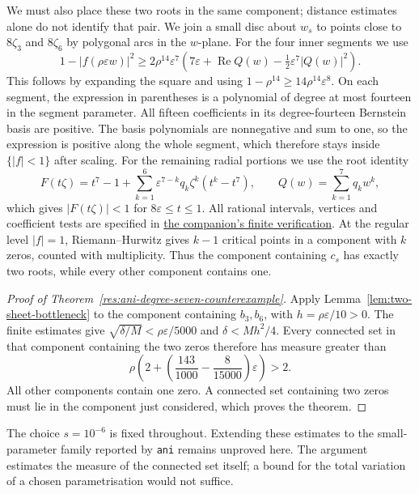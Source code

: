 \documentclass[11pt]{article}
\newcommand{\recordlink}[3]{\href{#1\##2}{#3}}
\begin{document}
We must also place these two roots in the same component; distance
estimates alone do not identify that pair. We join a small disc about $w_s$
to points close to $8\zeta_3$ and $8\zeta_6$ by polygonal arcs in the
$w$-plane. For the four inner segments we use
\[
 1-|f(\rho\varepsilon w)|^2\ge
 2\rho^{14}\varepsilon^7
 \left(7\varepsilon+\operatorname{Re}Q(w)
                       -\tfrac12\varepsilon^7|Q(w)|^2\right).
\]
This follows by expanding the square and using
$1-\rho^{14}\ge14\rho^{14}\varepsilon^8$.
On each segment, the expression in parentheses is a polynomial of degree
at most fourteen in the segment parameter. All fifteen coefficients in
its degree-fourteen Bernstein basis are positive. The basis polynomials
are nonnegative and sum to one, so the expression is positive along the
whole segment, which therefore stays inside $\{|f|<1\}$ after scaling. For the remaining radial
portions we use the root identity
\[
 F(t\zeta)=t^7-1+
       \sum_{k=1}^6\varepsilon^{7-k}q_k\zeta^k(t^k-t^7),
 \qquad Q(w)=\sum_{k=1}^7q_kw^k,
\]
which gives $|F(t\zeta)|<1$ for $8\varepsilon\le t\le1$.
All rational intervals, vertices and coefficient tests are specified in
\recordlink{erdos1041-lemniscate-reasoning-surface.pdf}{counterexample-certificate}
{the companion's finite verification}. At the regular level $|f|=1$,
Riemann--Hurwitz gives $k-1$ critical points in a component with $k$
zeros, counted with multiplicity. Thus the component containing $c_s$
has exactly two roots, while every other component contains one.


\begin{proof}[Proof of Theorem~\ref{res:ani-degree-seven-counterexample}]
Apply Lemma~\ref{lem:two-sheet-bottleneck} to the component containing
$b_3,b_6$, with $h=\rho\varepsilon/10>0$. The finite estimates give
$\sqrt{\delta/M}<\rho\varepsilon/5000$ and
$\delta<Mh^2/4$. Every connected set in that component containing the
two zeros therefore has measure greater than
\[
 \rho\left(2+\left(\frac{143}{1000}-\frac8{15000}\right)
                        \varepsilon\right)>2.
\]
All other components contain one zero. A connected set containing two
zeros must lie in the component just considered, which proves the theorem.
\end{proof}

The choice $s=10^{-6}$ is fixed throughout. Extending these estimates to
the small-parameter family reported by \texttt{ani} remains unproved
here. The argument estimates the measure of the connected set itself;
a bound for the total variation of a chosen parametrisation would not
suffice.
\end{document}
